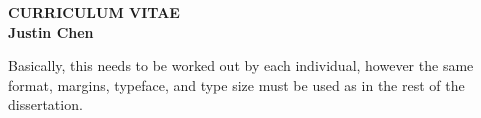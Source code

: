 
\thispagestyle{empty}

\begin{center}
{\LARGE {\bf CURRICULUM VITAE}}\\
\vspace{0.5in}
{\large {\bf Justin Chen}}
\end{center}

Basically, this needs to be worked out by each individual, however the same format, margins, typeface, and type size must be used as in the rest of the dissertation. 
